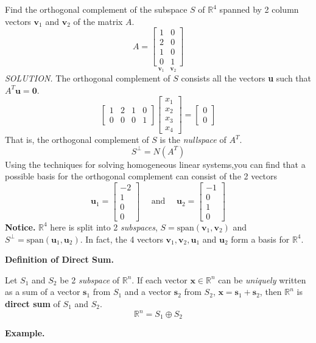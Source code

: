 \documentclass{article}
\newcommand\B{\textbf}
\newcommand\tcl{\begin{tcolorbox}[colback = {blue9}]}
\newcommand\etcl{\end{tcolorbox}}
\newcommand\R{\mathbb{R}}
\newcommand\T{\textit}
\begin{document}
    Find the orthogonal complement of the subspace $S$ of $\R^4$ spanned by 2 column vectors $\B{v}_1$ and $\B{v}_2$
    of the matrix $A$.
    \[ A =
            \underset{\B{v}_1 \quad \B{v}_2}{
            \begin{bmatrix}
                1 & 0 \\ 2 & 0 \\ 1 & 0 \\ 0 & 1
            \end{bmatrix}
            } \]
    \T{SOLUTION.} The orthogonal complement of $S$ consists all the vectors \B{u} such that $A^T\B{u} = \B{0}$.
    \[ \begin{bmatrix}
        1 & 2 & 1 & 0 \\
        0 & 0 & 0 & 1
    \end{bmatrix} 
    \begin{bmatrix}
        x_1 \\ 
        x_2 \\
        x_3\\
        x_4
    \end{bmatrix} = 
    \begin{bmatrix}
        0 \\
        0
    \end{bmatrix}\]
    That is, the orthogonal complement of $S$ is the \textit{nullspace} of $A^T$.
    \[S^\perp = N(A^T)\]
    Using the techniques for solving homogeneous linear systems,you can find that a possible basis for the
    orthogonal complement can consist of the 2 vectors
    \[ \B{u}_1 = 
        \begin{bmatrix}
            -2 \\
            1 \\ 0
            \\ 0
        \end{bmatrix} \quad \text{ and } \quad 
    \B{u}_2 = 
        \begin{bmatrix}
            -1 \\
            0  \\
            1 \\
            0
        \end{bmatrix} \]
    \B{Notice.} $\R^4$ here is split into 2 \textit{subspaces}, $S = \text{span}(\B{v}_1, \B{v}_2)$ and
    $S^\perp = \text{span}(\B{u}_1, \B{u}_2)$. In fact, the 4 vectors $\B{v}_1, \B{v}_2, \B{u}_1$ and $\B{u}_2$ form a basis for
    $\R^4$.
    \tcl
    \B{Definition of Direct Sum.} 

    Let $S_1$ and $S_2$ be 2 \T{subspace} of $\R^n$. If each vector $\B{x} \in \R^n$ can be \textit{uniquely} 
    written as a sum of a vector $\B{s}_1$ from $S_1$ and a vector $\B{s}_2$ from $S_2$, $\B{x} = \B{s}_1 + \B{s}_2$,
    then $\R^n$ is \textbf{direct sum} of $S_1$ and $S_2$.
    \[ \R^n = S_1 \oplus S_2 \]
    \etcl 
    \B{Example. }
\end{document}
